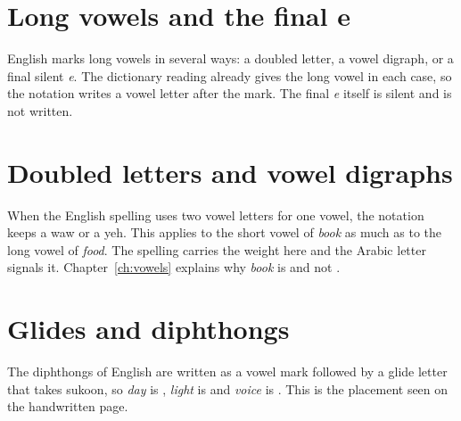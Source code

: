 \begin{table}[ht]\centering\small

\caption{Short vowels, written with a mark only.}\label{tab:wshort}
\end{table}

\section{Long vowels and the final e}
English marks long vowels in several ways: a doubled letter, a vowel digraph, or a final silent \emph{e}. The dictionary reading already gives the long vowel in each case, so the notation writes a vowel letter after the mark. The final \emph{e} itself is silent and is not written.

\begin{table}[ht]\centering\small

\caption{Long vowels and glides written for the silent-e pattern.}\label{tab:wlong}
\end{table}

\section{Doubled letters and vowel digraphs}
When the English spelling uses two vowel letters for one vowel, the notation keeps a waw or a yeh. This applies to the short vowel of \emph{book} as much as to the long vowel of \emph{food}. The spelling carries the weight here and the Arabic letter signals it. Chapter~\ref{ch:vowels} explains why \emph{book} is  and not .

\begin{table}[ht]\centering\small

\caption{Words with a written double o, and related spellings.}\label{tab:woo}
\end{table}

\begin{table}[ht]\centering\small

\caption{Words with ee and ea.}\label{tab:wee}
\end{table}

\section{Glides and diphthongs}
The diphthongs of English are written as a vowel mark followed by a glide letter that takes sukoon, so \emph{day} is , \emph{light} is  and \emph{voice} is . This is the placement seen on the handwritten page.


